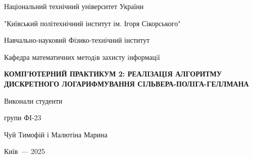 \documentclass[fontsize=14.4pt]{report}
\begin{document}
\thispagestyle{empty}
\begin{center}
Національний технічний університет України \par
"Київський політехнічний інститут ім. Ігоря Сікорського"\par
\vspace{5mm}
Навчально-науковий Фізико-технічний інститут\par
Кафедра математичних методiв захисту iнформацiї

\vspace{60mm}
\large\MakeUppercase{\textbf{Комп’ютерний практикум 2: реалiзацiя алгоритму дискретного логарифмування Сiльвера-Полiга-Геллмана}}\par
\vspace{1mm}

\end{center}

\vspace{50mm}
\begin{flushright}
Виконали студенти\par
групи ФІ-23\par
Чуй Тимофій і Малютіна Марина
\end{flushright}

\vspace{60mm}
\begin{center}
{Київ~--- 2025}
\end{center}

\newpage
{}
\end{document}
